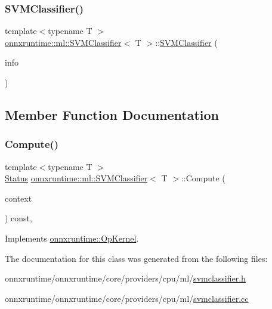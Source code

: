 \subsubsection{\texorpdfstring{S\+V\+M\+Classifier()}{SVMClassifier()}}
{\footnotesize\ttfamily template$<$typename T $>$ \\
\mbox{\hyperlink{classonnxruntime_1_1ml_1_1SVMClassifier}{onnxruntime\+::ml\+::\+S\+V\+M\+Classifier}}$<$ T $>$\+::\mbox{\hyperlink{classonnxruntime_1_1ml_1_1SVMClassifier}{S\+V\+M\+Classifier}} (\begin{DoxyParamCaption}\item[{const \mbox{\hyperlink{classonnxruntime_1_1OpKernelInfo}{Op\+Kernel\+Info}} \&}]{info }\end{DoxyParamCaption})}



\subsection{Member Function Documentation}
\mbox{\label{classonnxruntime_1_1ml_1_1SVMClassifier_ace2369bbab979ef247c5c9994e07c547}} 
\subsubsection{\texorpdfstring{Compute()}{Compute()}}
{\footnotesize\ttfamily template$<$typename T $>$ \\
\mbox{\hyperlink{classonnxruntime_1_1common_1_1Status}{Status}} \mbox{\hyperlink{classonnxruntime_1_1ml_1_1SVMClassifier}{onnxruntime\+::ml\+::\+S\+V\+M\+Classifier}}$<$ T $>$\+::Compute (\begin{DoxyParamCaption}\item[{\mbox{\hyperlink{classonnxruntime_1_1OpKernelContext}{Op\+Kernel\+Context}} $\ast$}]{context }\end{DoxyParamCaption}) const\hspace{0.3cm}{\ttfamily [override]}, {\ttfamily [virtual]}}



Implements \mbox{\hyperlink{classonnxruntime_1_1OpKernel_a9eca8656a78b1b3ab9d3351a12798650}{onnxruntime\+::\+Op\+Kernel}}.



The documentation for this class was generated from the following files\+:\begin{DoxyCompactItemize}
\item 
onnxruntime/onnxruntime/core/providers/cpu/ml/\mbox{\hyperlink{svmclassifier_8h}{svmclassifier.\+h}}\item 
onnxruntime/onnxruntime/core/providers/cpu/ml/\mbox{\hyperlink{svmclassifier_8cc}{svmclassifier.\+cc}}\end{DoxyCompactItemize}

